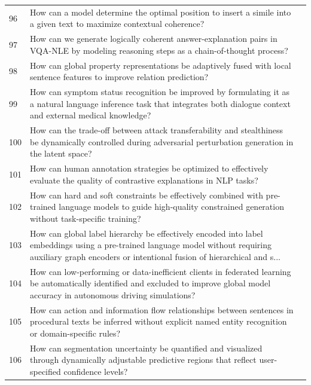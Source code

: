 \begin{longtable}{@{}p{0.5cm}p{7.2cm}p{2.5cm}@{}}
96 & How can a model determine the optimal position to insert a simile into a given text to maximize contextual coherence? & \cite{10.1609/aaai.v35i16.17691} \\
97 & How can we generate logically coherent answer-explanation pairs in VQA-NLE by modeling reasoning steps as a chain-of-thought process? & \cite{10.1609/aaai.v38i3.28065} \\
98 & How can global property representations be adaptively fused with local sentence features to improve relation prediction? & \cite{10.18653/v1/2022.findings-naacl.128} \\
99 & How can symptom status recognition be improved by formulating it as a natural language inference task that integrates both dialogue context and external medical knowledge? & \cite{10.18653/v1/2023.findings-acl.652} \\
100 & How can the trade-off between attack transferability and stealthiness be dynamically controlled during adversarial perturbation generation in the latent space? & \cite{10.1609/aaai.v38i4.28147} \\
101 & How can human annotation strategies be optimized to effectively evaluate the quality of contrastive explanations in NLP tasks? & \cite{10.18653/v1/2023.emnlp-main.427} \\
102 & How can hard and soft constraints be effectively combined with pre-trained language models to guide high-quality constrained generation without task-specific training? & \cite{10.18653/v1/2020.findings-emnlp.115} \\
103 & How can global label hierarchy be effectively encoded into label embeddings using a pre-trained language model without requiring auxiliary graph encoders or intentional fusion of hierarchical and s... & \cite{10.18653/v1/2022.emnlp-main.268} \\
104 & How can low-performing or data-inefficient clients in federated learning be automatically identified and excluded to improve global model accuracy in autonomous driving simulations? & \cite{10.1609/aaai.v37i13.26984} \\
105 & How can action and information flow relationships between sentences in procedural texts be inferred without explicit named entity recognition or domain-specific rules? & \cite{10.18653/v1/2021.findings-acl.345} \\
106 & How can segmentation uncertainty be quantified and visualized through dynamically adjustable predictive regions that reflect user-specified confidence levels? & \cite{10.1609/aaai.v37i13.26837} \\

\end{longtable}
